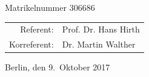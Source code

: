 \begin{titlepage}
\begin{center}
		Matrikelnummer 306686 \\

		\vfill
		\vfill
		\vfill
		\vfill
		\vfill


		\begin{tabular}{rl}
			Referent:    & Prof. Dr. Hans Hirth \\
			Korreferent: & Dr. Martin Walther   \\
		\end{tabular}

		\vfill

		Berlin, den 9.~Oktober 2017

	\end{center}
\end{titlepage}

\restoregeometry{}
